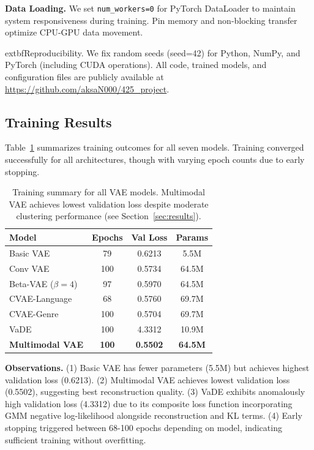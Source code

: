 \documentclass[10pt,twocolumn]{article}
\begin{document}
\textbf{Data Loading.} We set \texttt{num\_workers=0} for PyTorch DataLoader to maintain system responsiveness during training. Pin memory and non-blocking transfer optimize CPU-GPU data movement.

	extbf{Reproducibility.} We fix random seeds (seed=42) for Python, NumPy, and PyTorch (including CUDA operations). All code, trained models, and configuration files are publicly available at \url{https://github.com/aksaN000/425_project}.

\subsection{Training Results}

Table~\ref{tab:training_results} summarizes training outcomes for all seven models. Training converged successfully for all architectures, though with varying epoch counts due to early stopping.

\begin{table}[t]
\centering
\caption{Training summary for all VAE models. Multimodal VAE achieves lowest validation loss despite moderate clustering performance (see Section~\ref{sec:results}).}
\label{tab:training_results}
\small
\begin{tabular}{lccc}
\toprule
\textbf{Model} & \textbf{Epochs} & \textbf{Val Loss} & \textbf{Params} \\
\midrule
Basic VAE & 79 & 0.6213 & 5.5M \\
Conv VAE & 100 & 0.5734 & 64.5M \\
Beta-VAE ($\beta=4$) & 97 & 0.5970 & 64.5M \\
CVAE-Language & 68 & 0.5760 & 69.7M \\
CVAE-Genre & 100 & 0.5704 & 69.7M \\
VaDE & 100 & 4.3312 & 10.9M \\
\textbf{Multimodal VAE} & \textbf{100} & \textbf{0.5502} & \textbf{64.5M} \\
\bottomrule
\end{tabular}
\end{table}

\textbf{Observations.} (1) Basic VAE has fewer parameters (5.5M) but achieves highest validation loss (0.6213). (2) Multimodal VAE achieves lowest validation loss (0.5502), suggesting best reconstruction quality. (3) VaDE exhibits anomalously high validation loss (4.3312) due to its composite loss function incorporating GMM negative log-likelihood alongside reconstruction and KL terms. (4) Early stopping triggered between 68-100 epochs depending on model, indicating sufficient training without overfitting.
\end{document}
